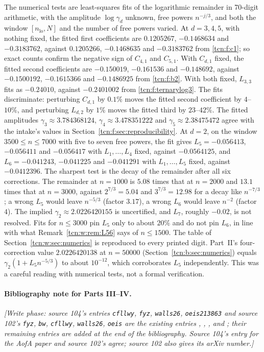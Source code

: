 \documentclass[11pt,letterpaper]{article}
\theoremstyle{remark}
\begin{document}
The numerical tests are least-squares fits of the logarithmic remainder in 70-digit arithmetic, with the amplitude $\log\gamma_d$ unknown, free powers $n^{-j/3}$, and both the window $[n_{\mathrm{lo}},N]$ and the number of free powers varied. At $d=3,4,5$, with nothing fixed, the fitted first coefficients are $0.1205267$, $-0.1468634$ and $-0.3183762$, against $0.1205266$, $-0.1468635$ and $-0.3183762$ from \eqref{tcn:f:c1}; so exact counts confirm the negative sign of $C_{4,1}$ and $C_{5,1}$. With $C_{d,1}$ fixed, the fitted second coefficients are $-0.150019$, $-0.161536$ and $-0.148692$, against $-0.1500192$, $-0.1615366$ and $-0.1486925$ from \eqref{tcn:f:b2}. With both fixed, $L_{3,3}$ fits as $-0.24010$, against $-0.2401002$ from \eqref{tcn:f:ternarylog3}. The fits discriminate: perturbing $C_{d,1}$ by $0.1\%$ moves the fitted second coefficient by $4$--$10\%$, and perturbing $L_{d,2}$ by $1\%$ moves the fitted third by $23$--$42\%$. The fitted amplitudes $\gamma_3\approx3.784368124$, $\gamma_4\approx3.478351222$ and $\gamma_5\approx2.38475472$ agree with the intake's values in Section~\ref{tcn:f:sec:reproducibility}. At $d=2$, on the window $3500\le n\le7000$ with five to seven free powers, the fit gives $L_5=-0.056413$, $-0.056411$ and $-0.056417$ with $L_1,\ldots,L_4$ fixed, against $-0.0564125$, and $L_6=-0.041243$, $-0.041225$ and $-0.041291$ with $L_1,\ldots,L_5$ fixed, against $-0.0412396$. The sharpest test is the decay of the remainder after all six corrections. The remainder at $n=1000$ is $5.08$ times that at $n=2000$ and $13.1$ times that at $n=3000$, against $2^{7/3}=5.04$ and $3^{7/3}=12.98$ for a decay like $n^{-7/3}$; a wrong $L_5$ would leave $n^{-5/3}$ (factor $3.17$), a wrong $L_6$ would leave $n^{-2}$ (factor $4$). The implied $\gamma_2\approx2.0226420155$ is uncertified, and $L_7$, roughly $-0.02$, is not resolved. Fits for $n\le3000$ pin $L_5$ only to about $20\%$ and do not pin $L_6$, in line with what Remark~\ref{tcn:w:rem:L56} says of $n\le1500$. The table of Section~\ref{tcn:w:sec:numerics} is reproduced to every printed digit. Part~II's four-correction value $2.0226420138$ at $n=50000$ (Section~\ref{tcn:b:sec:numerics}) equals $\gamma_2(1+L_5n^{-5/3})$ to about $10^{-12}$, which corroborates $L_5$ independently. This was a careful reading with numerical tests, not a formal verification.

\paragraph{Bibliography note for Parts III--IV.} \emph{[Write phase: source 104's entries \texttt{cfllwy}, \texttt{fyz}, \texttt{walls26}, \texttt{oeis213863} and source 102's \texttt{fyz}, \texttt{bw}, \texttt{cfllwy}, \texttt{walls26}, \texttt{oeis} are the existing entries \cite{Chang2024}, \cite{FYZ2021}, \cite{LL2026}, \cite{OEIS} and \cite{BW2021}; their remaining entries are added at the end of the bibliography. Source 104's entry for the AofA paper and source 102's agree; source 102 also gives its arXiv number.]}
\end{document}
